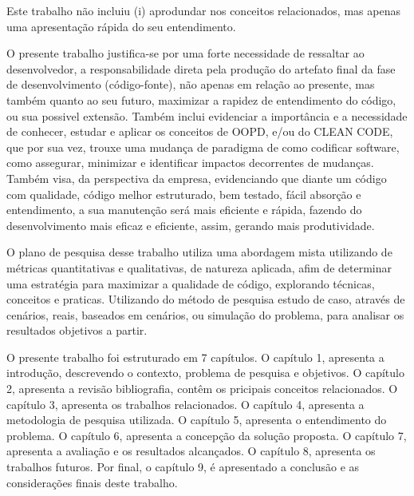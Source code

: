 \documentclass[12pt]{article}
\begin{document}
Este trabalho não incluiu 
(i) aprodundar nos conceitos relacionados, mas apenas uma apresentação rápida do seu entendimento. 


O presente trabalho justifica-se por uma forte necessidade de ressaltar ao desenvolvedor, a responsabilidade direta pela produção do artefato final da fase de desenvolvimento (código-fonte)\cite{TR_CLEAN_CODE_IMPORTANCIA}, não apenas em relação ao presente, mas também quanto ao seu futuro, maximizar a rapidez de entendimento do código, ou sua possivel extensão. Também inclui evidenciar a importância e a necessidade de conhecer, estudar e aplicar os conceitos de OOPD, e/ou do CLEAN CODE, que por sua vez, trouxe uma mudança de paradigma de como codificar software, como assegurar, minimizar e identificar impactos decorrentes de mudanças\cite{CODE_SIMPLICITY}.
Também visa, da perspectiva da empresa, evidenciando que diante um código com qualidade, código melhor estruturado, bem testado, fácil absorção e entendimento, a sua manutenção será mais eficiente e rápida, fazendo do desenvolvimento mais eficaz e eficiente, assim, gerando mais produtividade.

O plano de pesquisa desse trabalho utiliza uma abordagem mista utilizando de métricas quantitativas e qualitativas, de natureza aplicada, afim de determinar uma estratégia para maximizar a qualidade de código, explorando técnicas, conceitos e praticas. Utilizando do método de pesquisa estudo de caso, através de cenários, reais, baseados em cenários, ou simulação do problema, para analisar os resultados objetivos a partir. 

O presente trabalho foi estruturado em 7 capítulos.
O capítulo 1, apresenta a introdução, descrevendo o contexto, problema de pesquisa e objetivos.
O capítulo 2, apresenta a revisão bibliografia, contêm os pricipais conceitos relacionados.
O capítulo 3, apresenta os trabalhos relacionados.
O capítulo 4, apresenta a metodologia de pesquisa utilizada.
O capítulo 5, apresenta o entendimento do problema.
O capítulo 6, apresenta a concepção da solução proposta.
O capítulo 7, apresenta a avaliação e os resultados alcançados.
O capítulo 8, apresenta os trabalhos futuros.
Por final, o capítulo 9, é apresentado a conclusão e as considerações finais deste trabalho.
\end{document}
